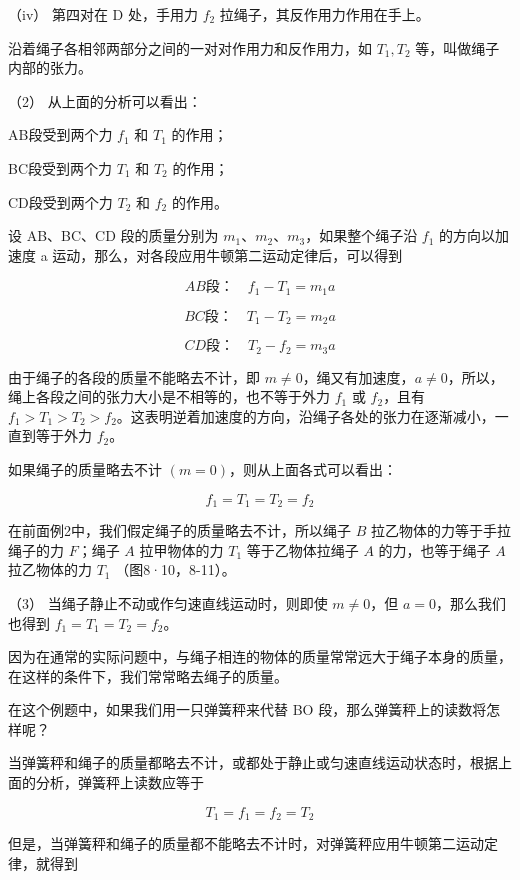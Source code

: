 （iv） 第四对在 D 处，手用力 \(f_{2}\) 拉绳子，其反作用力作用在手上。

沿着绳子各相邻两部分之间的一对对作用力和反作用力，如 \(T_{1}, T_{2}\)
等，叫做绳子内部的张力。

（2） 从上面的分析可以看出：

AB段受到两个力 \(f_{1}\) 和 \(T_{1}\) 的作用；

BC段受到两个力 \(T_{1}\) 和 \(T_{2}\) 的作用；

CD段受到两个力 \(T_{2}\) 和 \(f_{2}\) 的作用。

设 AB、BC、CD 段的质量分别为
\(m_{1}\)、\(m_{2}\)、\(m_{3}\)，如果整个绳子沿 \(f_{1}\) 的方向以加速度
a 运动，那么，对各段应用牛顿第二运动定律后，可以得到

\[
A B \text{段：} \quad f _ {1} - T _ {1} = m _ {1} a
\]

\[
B C \text{段：} \quad T _ {1} - T _ {2} = m _ {2} a
\]

\[
C D \text{段：} \quad T _ {2} - f _ {2} = m _ {3} a
\]

由于绳子的各段的质量不能略去不计，即
\(m \neq 0\)，绳又有加速度，\(a \neq 0\)，所以，绳上各段之间的张力大小是不相等的，也不等于外力
\(f_{1}\) 或 \(f_{2}\)，且有
\(f_{1} > T_{1} > T_{2} > f_{2}\)。这表明逆着加速度的方向，沿绳子各处的张力在逐渐减小，一直到等于外力
\(f_{2}\)。

如果绳子的质量略去不计 \((m = 0)\)，则从上面各式可以看出：

\[
f _ {1} = T _ {1} = T _ {2} = f _ {2}
\]

在前面例2中，我们假定绳子的质量略去不计，所以绳子 \(B\)
拉乙物体的力等于手拉绳子的力 \(F\)；绳子 \(A\) 拉甲物体的力 \(T_{1}\)
等于乙物体拉绳子 \(A\) 的力，也等于绳子 \(A\) 拉乙物体的力 \(T_{1}\)
（图8·10，8-11）。

（3） 当绳子静止不动或作匀速直线运动时，则即使 \(m \neq 0\)，但
\(a = 0\)，那么我们也得到 \(f_{1} = T_{1} = T_{2} = f_{2}\)。

因为在通常的实际问题中，与绳子相连的物体的质量常常远大于绳子本身的质量，在这样的条件下，我们常常略去绳子的质量。

在这个例题中，如果我们用一只弹簧秤来代替 BO
段，那么弹簧秤上的读数将怎样呢？

当弹簧秤和绳子的质量都略去不计，或都处于静止或匀速直线运动状态时，根据上面的分析，弹簧秤上读数应等于

\[
T _ {1} = f _ {1} = f _ {2} = T _ {2}
\]

但是，当弹簧秤和绳子的质量都不能略去不计时，对弹簧秤应用牛顿第二运动定律，就得到

